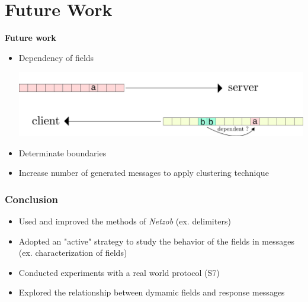 \documentclass{beamer}
\newcounter{m} %
\newcounter{c} %
\begin{document}
\section{Future Work}


\begin{frame}{\bf Future work}

\begin{itemize}
    \item Dependency of fields\\
    \begin{center}\includegraphics[scale=0.5]{relations.png}\end{center}
    \item Determinate boundaries
    \item Increase number of generated messages to apply clustering technique
\end{itemize}
\end{frame}

\begin{frame}\frametitle{\bf Conclusion}
  \begin{itemize}
    \item Used and improved the methods of {\em Netzob} (ex. delimiters)
    \item Adopted an "active" strategy to study the behavior of the fields in messages (ex. characterization of fields)
    \item Conducted experiments with a real world protocol (S7)
    \item Explored the relationship between dymamic fields and response messages
  \end{itemize}
\end{frame}
\end{document}
